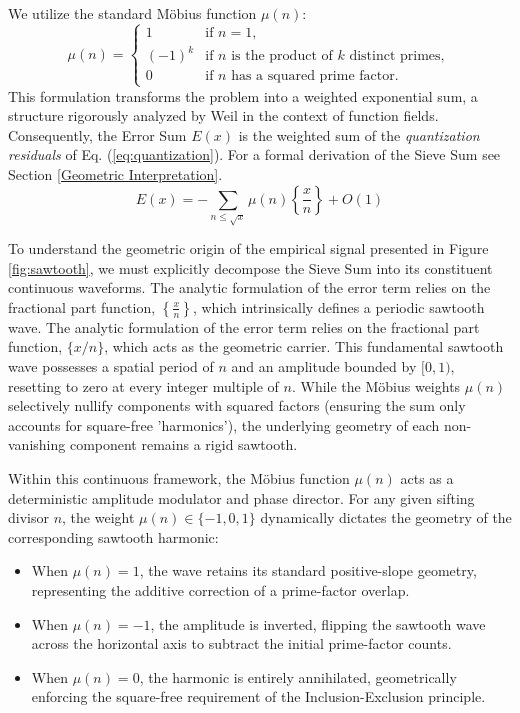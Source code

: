 \documentclass[sn-mathphys-num, pdflatex, referee]{sn-jnl}
\begin{document}
We utilize the standard Möbius function $\mu(n)$:
\begin{equation}
\mu(n) =
\begin{cases}
1 & \text{if } n=1, \\
(-1)^k & \text{if } n \text{ is the product of } k \text{ distinct primes}, \\
0 & \text{if } n \text{ has a squared prime factor}.
\end{cases}
\end{equation}
This formulation transforms the problem into a weighted exponential sum, a structure rigorously analyzed by Weil \cite{weil} in the context of function fields. Consequently, the Error Sum $E(x)$ is the weighted sum of the \textit{quantization residuals} of Eq. (\ref{eq:quantization}). 
For a formal derivation of the Sieve Sum see Section \ref{Geometric Interpretation}.
\begin{equation}
\label{eq:mobius_sum}
E(x) = - \sum_{n \le \sqrt{x}} \mu(n) \left\{ \frac{x}{n} \right\} + O(1)
\end{equation}

To understand the geometric origin of the empirical signal presented in Figure \ref{fig:sawtooth}, we must explicitly decompose the Sieve Sum into its constituent continuous waveforms. The analytic formulation of the error term relies on the fractional part function, $\left\{ \frac{x}{n} \right\}$, which intrinsically defines a periodic sawtooth wave. The analytic formulation of the error term relies on the fractional part function, $\{x/n\}$, which acts as the geometric carrier. This fundamental sawtooth wave possesses a spatial period of $n$ and an amplitude bounded by $[0, 1)$, resetting to zero at every integer multiple of $n$. While the Möbius weights $\mu(n)$ selectively nullify components with squared factors (ensuring the sum only accounts for square-free 'harmonics'), the underlying geometry of each non-vanishing component remains a rigid sawtooth.

Within this continuous framework, the M\"obius function $\mu(n)$ acts as a deterministic amplitude modulator and phase director. For any given sifting divisor $n$, the weight $\mu(n) \in \{-1, 0, 1\}$ dynamically dictates the geometry of the corresponding sawtooth harmonic:
\begin{itemize}
    \item When $\mu(n) = 1$, the wave retains its standard positive-slope geometry, representing the additive correction of a prime-factor overlap.
    \item When $\mu(n) = -1$, the amplitude is inverted, flipping the sawtooth wave across the horizontal axis to subtract the initial prime-factor counts.
    \item When $\mu(n) = 0$, the harmonic is entirely annihilated, geometrically enforcing the square-free requirement of the Inclusion-Exclusion principle.
\end{itemize}
\end{document}
